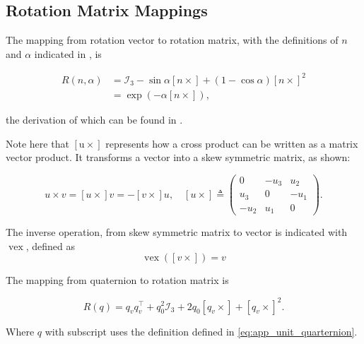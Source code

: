 \subsection{Rotation Matrix Mappings}
\label{sec:rotmatmappings}

The mapping from rotation vector to rotation matrix, with the definitions of $n$ and $\alpha$ indicated in , is

\begin{subequations}
	\begin{align}
		\label{eq:rotvec2rotmat}
		R\left(n, \alpha\right) &=\mathcal{I}_{3}-\sin \alpha\left[n \times\right]+(1-\cos \alpha)\left[n \times\right]^{2} \\
		& =\exp \left(-\alpha\left[n \times\right]\right),
	\end{align}
\end{subequations}


the derivation of which can be found in \citet{Kok2017}.

Note here that $\left[\mathrm{u} \times\right]$ represents how  a cross product can be written as a matrix vector product. It transforms a vector into a skew symmetric matrix, as shown:

\begin{equation}
	\label{eq:app_veccrossprod}
	u \times v=[u \times] v=-[v \times] u, \quad[u \times] \triangleq\left(\begin{array}{ccc}{0} & {-u_{3}} & {u_{2}} \\ {u_{3}} & {0} & {-u_{1}} \\ {-u_{2}} & {u_{1}} & {0}\end{array}\right).
\end{equation}

The inverse operation, from skew symmetric matrix to vector is indicated with $\operatorname{vex}$, defined as
\begin{equation}
	\label{eq:app_invveccrossprod}
	\operatorname{vex}([v \times]) = v
\end{equation}

The mapping from quaternion to rotation matrix is

\begin{equation}
	\label{eqapp_:quat2rotmat}
	R(q) = q_{v} q_{v}^{\top}+q_{0}^{2} \mathcal{I}_{3}+2 q_{0}\left[q_{v} \times\right]+\left[q_{v} \times\right]^{2}.
\end{equation}

Where $q$ with subscript uses the definition defined in \eqref{eq:app_unit_quarternion}.



